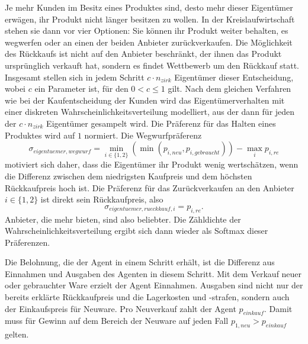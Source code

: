 Je mehr Kunden im Besitz eines Produktes sind, desto mehr dieser Eigentümer erwägen, ihr Produkt nicht länger besitzen zu wollen.
In der Kreislaufwirtschaft stehen sie dann vor vier Optionen:
Sie können ihr Produkt weiter behalten, es wegwerfen oder an einen der beiden Anbieter zurückverkaufen.
Die Möglichkeit des Rückkaufs ist nicht auf den Anbieter beschränkt, der ihnen das Produkt ursprünglich verkauft hat, sondern es findet Wettbewerb um den Rückkauf statt.
Insgesamt stellen sich in jedem Schritt $c \cdot n_{zirk}$ Eigentümer dieser Entscheidung, wobei $c$ ein Parameter ist, für den $0 < c \leq 1$ gilt.
Nach dem gleichen Verfahren wie bei der Kaufentscheidung der Kunden wird das Eigentümerverhalten mit einer diskreten Wahrscheinlichkeitsverteilung modelliert, aus der dann für jeden der $c \cdot n_{zirk}$ Eigentümer gesampelt wird.
Die Präferenz für das Halten eines Produktes wird auf $1$ normiert.
Die Wegwurfpräferenz
\begin{equation}
	\sigma_{eigentuemer, wegwurf} = \min_{i\in\{1, 2\}}{\left(\min{(p_{i, neu}, p_{i, gebraucht})}\right)} - \max_{i}{p_{i, re}}
\end{equation}
motiviert sich daher, dass die Eigentümer ihr Produkt wenig wertschätzen, wenn die Differenz zwischen dem niedrigsten Kaufpreis und dem höchsten Rückkaufpreis hoch ist.
Die Präferenz für das Zurückverkaufen an den Anbieter $i\in\{1, 2\}$ ist direkt sein Rückkaufpreis, also
\begin{equation}
	\sigma_{eigentuemer, rueckkauf, i} = p_{i, re}.
\end{equation}
Anbieter, die mehr bieten, sind also beliebter.
Die Zähldichte der Wahrscheinlichkeitsverteilung ergibt sich dann wieder als Softmax dieser Präferenzen.

Die Belohnung, die der Agent in einem Schritt erhält, ist die Differenz aus Einnahmen und Ausgaben des Agenten in diesem Schritt.
Mit dem Verkauf neuer oder gebrauchter Ware erzielt der Agent Einnahmen.
Ausgaben sind nicht nur der bereits erklärte Rückkaufpreis und die Lagerkosten und -strafen, sondern auch der Einkaufspreis für Neuware.
Pro Neuverkauf zahlt der Agent $p_{einkauf}$.
Damit muss für Gewinn auf dem Bereich der Neuware auf jeden Fall $p_{1, neu} > p_{einkauf}$ gelten.

